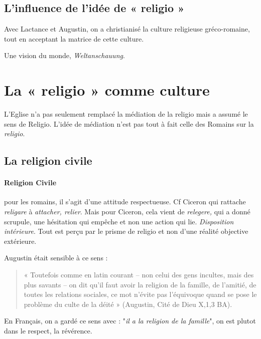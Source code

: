  


\subsection{L’influence de l’idée de « religio »}
 
 Avec Lactance et Augustin, on a christianisé la culture religieuse gréco-romaine, tout en acceptant la matrice de cette culture.

Une vision du monde, \emph{Weltanschauung}.




\section{La « religio » comme culture }

L'Eglise n'a pas seulement remplacé la médiation de la religio mais a assumé le sens de Religio. L'idée de médiation n'est pas tout à fait celle des Romains sur la \textit{religio}.




\subsection{La religion civile}
\paragraph{Religion Civile} pour les romains, il s'agit d'une attitude respectueuse. Cf Ciceron qui rattache \textit{religare} à \textit{attacher, relier}. Mais pour Ciceron, cela vient de \textit{relegere,} qui a donné scrupule, une hésitation qui empêche et non une action qui lie. \textit{Disposition intérieure}. Tout est perçu par le prisme de religio et non d'une réalité objective extérieure.

Augustin était sensible à ce sens : 
\begin{quote}
     « Toutefois comme en latin courant – non celui des gens incultes, mais des plus savants – on dit qu’il faut avoir la religion de la famille, de l’amitié, de toutes les relations sociales, ce mot n’évite pas l’équivoque quand se pose le problème du culte de la déité » (Augustin, Cité de Dieu X,1,3 BA).
\end{quote}
\begin{Ex}
En Français, on a gardé ce sens avec : 
"\textit{il a la religion de la famille}", on est plutot dans le respect, la révérence.

\end{Ex}


